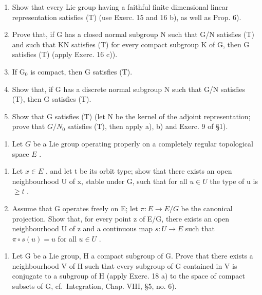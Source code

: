 \begin{enumerate}
\def\labelenumi{\alph{enumi})}
\item
  Show that every Lie group having a faithful finite dimensional linear representation satisfies (T) (use Exerc. 15 and 16 b), as well as Prop. 6).
\item
  Prove that, if G has a closed normal subgroup N such that G/N satisfies (T) and such that KN satisfies (T) for every compact subgroup K of G, then G satisfies (T) (apply Exerc. 16 c)).
\item
  If \(\mathrm{G}_0\) is compact, then G satisfies (T).
\item
  Show that, if G has a discrete normal subgroup N such that G/N satisfies (T), then G satisfies (T).
\item
  Show that G satisfies (T) (let N be the kernel of the adjoint representation; prove that \(G/N_{0}\) satisfies (T), then apply a), b) and Exerc. 9 of §1).
\end{enumerate}

\begin{enumerate}
\def\labelenumi{\arabic{enumi})}
\setcounter{enumi}{17}
\tightlist
\item
  Let \(G\) be a Lie group operating properly on a completely regular topological space \(E\) .
\end{enumerate}

\begin{enumerate}
\def\labelenumi{\alph{enumi})}
\item
  Let \(x \in E\) , and let t be its orbit type; show that there exists an open neighbourhood U of x, stable under G, such that for all \(u \in U\) the type of u is \(\geq t\) .
\item
  Assume that G operates freely on E; let \(\pi: E \to E/G\) be the canonical projection. Show that, for every point z of E/G, there exists an open neighbourhood U of z and a continuous map \(s: U \to E\) such that \(\pi \circ s(u) = u\) for all \(u \in U\) .
\end{enumerate}

\begin{enumerate}
\def\labelenumi{\arabic{enumi})}
\setcounter{enumi}{18}
\tightlist
\item
  Let G be a Lie group, H a compact subgroup of G. Prove that there exists a neighbourhood V of H such that every subgroup of G contained in V is conjugate to a subgroup of H (apply Exerc. 18 a) to the space of compact subsets of G, cf.~Integration, Chap. VIII, §5, no. 6).
\end{enumerate}

